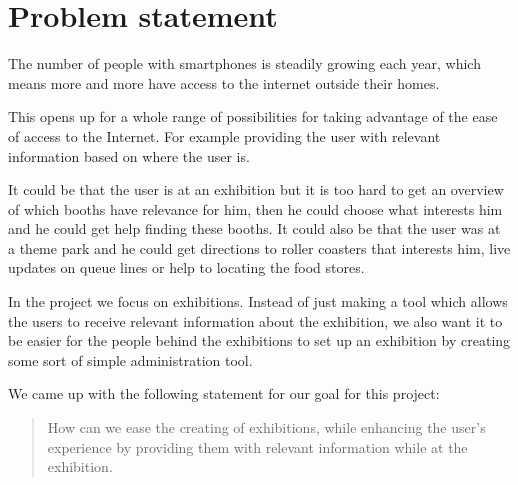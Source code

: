 \section{Problem statement}

The number of people with smartphones is steadily growing each year, which means more and more have access to the internet outside their homes.

This opens up for a whole range of possibilities for taking advantage of the ease of access to the Internet. For example providing the user with relevant information based on where the user is. 

It could be that the user is at an exhibition but it is too hard to get an overview of which booths have relevance for him, then he could choose what interests him and he could get help finding these booths. It could also be that the user was at a theme park and he could get directions to roller coasters that interests him, live updates on queue lines or help to locating the food stores.

In the project we focus on exhibitions. Instead of just making a tool which allows the users to receive relevant information about the exhibition, we also want it to be easier for the people behind the exhibitions to set up an exhibition by creating some sort of simple administration tool.

We came up with the following statement for our goal for this project:

\begin{quote}
How can we ease the creating of exhibitions, while enhancing the user's experience by providing them with relevant information while at the exhibition.
\end{quote}

